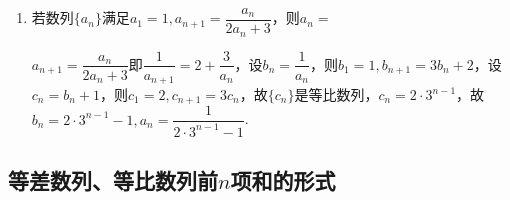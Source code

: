 \begin{enumerate}
\begin{jieda}
    \end{jieda}
    \item 若数列$\{a_n\}$满足$a_1 = 1, a_{n+1} = \dfrac{a_n}{2a_n + 3}$，则$a_n = $
    \begin{jieda}
        $a_{n+1} = \dfrac{a_n}{2a_n + 3}$即$\dfrac{1}{a_{n+1}} = 2 + \dfrac{3}{a_n}$，设$b_n = \dfrac{1}{a_n}$，则$b_1 = 1, b_{n+1} = 3b_n + 2$，设$c_n = b_n + 1$，则$c_1 = 2, c_{n+1} = 3c_n$，故$\{c_n\}$是等比数列，$c_n = 2 \cdot 3^{n-1}$，故$b_n = 2\cdot 3^{n-1}-1, a_n = \dfrac{1}{2\cdot 3^{n-1}-1}$.
    \end{jieda}
\end{enumerate}
\subsection*{等差数列、等比数列前$n$项和的形式}
